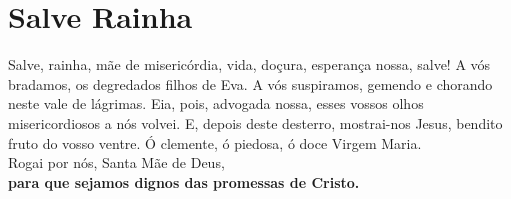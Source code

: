 \section*{Salve Rainha}
Salve, rainha, 
mãe de misericórdia, 
vida, doçura, esperança nossa, salve! 
A vós bradamos, 
os degredados filhos de Eva. 
A vós suspiramos, gemendo e chorando 
neste vale de lágrimas. 
Eia, pois, advogada nossa, 
esses vossos olhos misericordiosos 
a nós volvei. 
E, depois deste desterro, 
mostrai-nos Jesus, bendito fruto 
do vosso ventre. 
Ó clemente, ó piedosa, 
ó doce Virgem Maria. \\

Rogai por nós, Santa Mãe de Deus, \\
\textbf{para que sejamos dignos das promessas de Cristo.}
